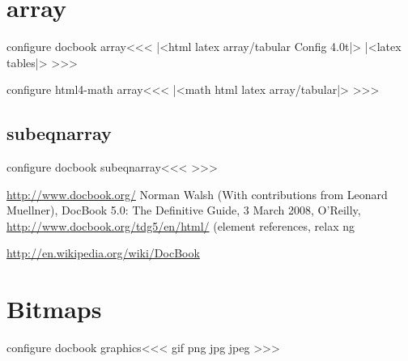 \section{array}



\<configure docbook array\><<<
|<html latex array/tabular Config 4.0t|>
|<latex tables|>
>>>


\<configure html4-math array\><<<
|<math html latex array/tabular|>
>>>





\subsection{subeqnarray}


\<configure docbook subeqnarray\><<<
   {\ifvmode \IgnorePar\fi \EndP  
    }  
   {\ifvmode \IgnorePar\fi \EndP {}}  
   {}{} 
>>>

\begin{thebibliography}{9}
\url{http://www.docbook.org/}
Norman Walsh
(With contributions from Leonard Muellner),
DocBook 5.0: The Definitive Guide,
3 March 2008,
O'Reilly,
\url{http://www.docbook.org/tdg5/en/html/}
(element references\EndLink, relax ng\EndLink

\url{http://en.wikipedia.org/wiki/DocBook}
\end{thebibliography}


\section{Bitmaps}



\<configure docbook graphics\><<< 
   {gif} 
   {{\Needs{}}%
    } 
   {png} 
   {{\Needs{}}%
    } 
   {jpg} 
   {{\Needs{}}%
    } 
   {jpeg} 
   {{\Needs{}}%
    }
>>>

